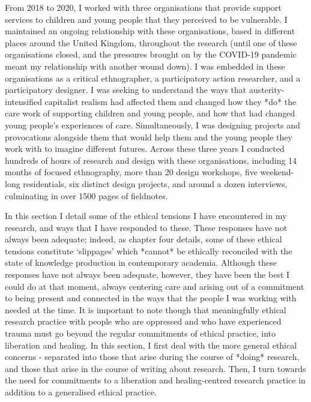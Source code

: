From 2018 to 2020, I worked with three organisations that provide support services to children and young people that they perceived to be vulnerable. I maintained an ongoing relationship with these organisations, based in different places around the United Kingdom, throughout the research (until one of these organisations closed, and the pressures brought on by the COVID-19 pandemic meant my relationship with another wound down). I was embedded in these organisations as a critical ethnographer, a participatory action researcher, and a participatory designer. I was seeking to understand the ways that austerity-intensified capitalist realism had affected them and changed how they *do* the care work of supporting children and young people, and how that had changed young people’s experiences of care. Simultaneously, I was designing projects and provocations alongside them that would help them and the young people they work with to imagine different futures.  Across these three years I conducted hundreds of hours of research and design with these organisations, including 14 months of focused ethnography, more than 20 design workshops, five weekend-long residentials, six distinct design projects, and around a dozen interviews, culminating in over 1500 pages of fieldnotes.  

In this section I detail some of the ethical tensions I have encountered in my research, and ways that I have responded to these. These responses have not always been adequate; indeed, as chapter four details, some of these ethical tensions constitute ‘slippages’ which *cannot* be ethically reconciled with the state of knowledge production in contemporary academia. Although these responses have not always been adequate, however, they have been the best I could do at that moment, always centering care and arising out of a  commitment to being present and connected in the ways that the people I was working with needed at the time. It is important to note though that meaningfully ethical research practice with people who are oppressed and who have experienced trauma must go beyond the regular commitments of ethical practice, into liberation and healing. In this section, I first deal with the more general ethical concerns -  separated into those that arise during the course of *doing* research, and those that arise in the course of writing about  research. Then, I turn towards the need for commitments to a liberation and healing-centred research practice in addition to a generalised ethical practice.

